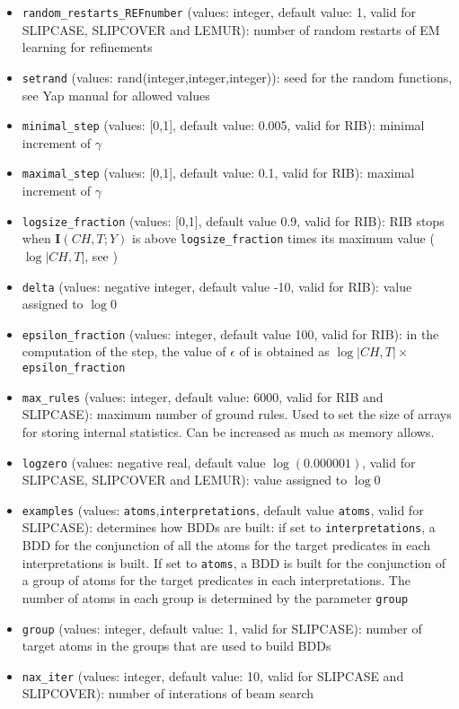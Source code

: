 \documentclass[a4paper,10pt]{scrartcl}
\begin{document}
\begin{itemize}
\item \verb|random_restarts_REFnumber| (values: integer, default value: 1, valid for  SLIPCASE, SLIPCOVER and LEMUR): number of random restarts of EM learning for refinements
\item \verb|setrand| (values: rand(integer,integer,integer)): seed for the random functions, see Yap manual for allowed values
\item \verb|minimal_step| (values: [0,1], default value: 0.005, valid for RIB): minimal increment of $\gamma$
\item \verb|maximal_step| (values: [0,1], default value: 0.1, valid for RIB): maximal increment of $\gamma$
\item \verb|logsize_fraction| (values: [0,1], default value 0.9, valid for RIB): RIB stops when $\mathbf{I}(CH,T;Y)$ is above \verb|logsize_fraction| times its maximum value ($\log |CH,T|$, see \cite{DBLP:journals/jmlr/ElidanF05})
\item \verb|delta| (values: negative integer, default value -10, valid for RIB): value assigned to $\log 0$
\item \verb|epsilon_fraction| (values: integer, default value 100, valid for RIB): in the computation of the step, the value of $\epsilon$ of \cite{DBLP:journals/jmlr/ElidanF05} is obtained as $\log |CH,T|\times$\verb|epsilon_fraction|
\item \verb|max_rules| (values: integer, default value: 6000, valid for RIB and SLIPCASE): maximum number of ground rules. Used to set the size of arrays for storing internal statistics. Can be increased as much as memory allows.
\item \verb|logzero| (values: negative real, default value $\log(0.000001)$, valid for SLIPCASE, SLIPCOVER and LEMUR): value assigned to $\log 0$
\item \verb|examples| (values: \verb|atoms|,\verb|interpretations|, default value \verb|atoms|, valid for SLIPCASE): determines how BDDs are built: if set to \verb|interpretations|, a BDD for the conjunction of all the atoms for the target predicates in each interpretations is built. 
If set to \verb|atoms|, a BDD is built for the conjunction of a group of atoms for the target predicates in each interpretations. The number of atoms in each group is determined by the parameter \verb|group|
\item \verb|group| (values: integer, default value: 1, valid for SLIPCASE): number of target atoms in the groups that are used to build BDDs
\item \verb|nax_iter| (values: integer, default value: 10, valid for SLIPCASE and SLIPCOVER): number of interations of beam search

\end{itemize}
\end{document}
